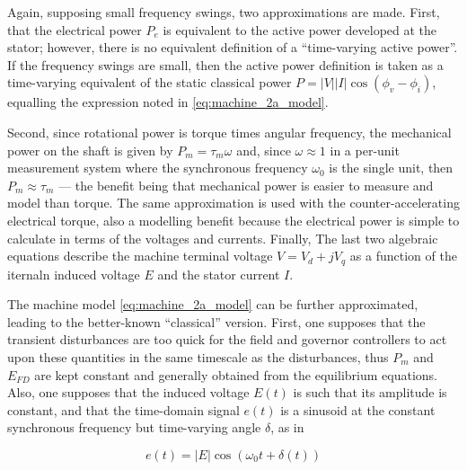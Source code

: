 	Again, supposing small frequency swings, two approximations are made. First, that the electrical power $P_e$ is equivalent to the active power developed at the stator; however, there is no equivalent definition of a ``time-varying active power''. If the frequency swings are small, then the active power definition is taken as a time-varying equivalent of the static classical power $P = \left\lvert V\right\rvert\left\lvert I\right\rvert\cos\left(\phi_v - \phi_i\right)$, equalling the expression noted in \eqref{eq:machine_2a_model}.

	Second, since rotational power is torque times angular frequency, the mechanical power on the shaft is given by $P_m = \tau_m\omega$ and, since $\omega\approx 1$ in a per-unit measurement system where the synchronous frequency $\omega_0$ is the single unit, then $P_m \approx \tau_m$ — the benefit being that mechanical power is easier to measure and model than torque. The same approximation is used with the counter-accelerating electrical torque, also a modelling benefit because the electrical power is simple to calculate in terms of the voltages and currents. Finally, The last two algebraic equations describe the machine terminal voltage $V = V_d + jV_q$ as a function of the iternaln induced voltage $E$ and the stator current $I$.

	The machine model \eqref{eq:machine_2a_model} can be further approximated, leading to the better-known ``classical'' version. First, one supposes that the transient disturbances are too quick for the field and governor controllers to act upon these quantities in the same timescale as the disturbances, thus $P_m$ and $E_{FD}$ are kept constant and generally obtained from the equilibrium equations. Also, one supposes that the induced voltage $E(t)$ is such that its amplitude is constant, and that the time-domain signal $e(t)$ is a sinusoid at the constant synchronous frequency but time-varying angle $\delta$, as in

\begin{equation} e(t) = \left\lvert E\right\rvert\cos\left(\omega_0 t + \delta(t)\right) \label{eq:equivalent_emt_E} \end{equation}

